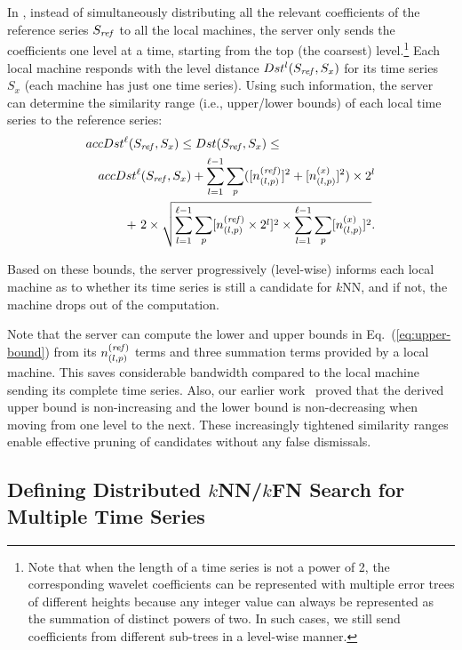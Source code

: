 In \LeeWave{}, instead of simultaneously distributing all the relevant
coefficients of the reference series $\Sref$ to all the local machines,
the server only sends the coefficients one level at a time, starting
from the top (the coarsest) level.\footnote{\label{fnt:T}Note
that when the length of a time series is not a power of 2, the
corresponding wavelet coefficients can be represented with multiple
error trees of different heights because any integer value can always
be represented as the summation of distinct powers of two. In such
cases, we still send coefficients from different
sub-trees in a level-wise manner.} Each local machine responds with the
level distance $Dst^{l}(\Sref,S_x)$ for its time series $S_x$ (each machine has
just one time series). Using
such information, the server can determine the similarity range (i.e.,
upper/lower bounds) of each local time series to the reference series:
{\small
\begin{eqnarray}\label{eq:upper-bound}
\lefteqn{accDst^{\ell }(\Sref,S_{x}) \leq Dst(\Sref,S_{x}) \leq} \notag\\
&& accDst^{\ell }(\Sref,S_{x})+\sum_{l=1}^{\ell-1}
  \sum_{p}([n_{(l,p)}^{(\supref)}]^{2}+[n_{(l,p)}^{(x)}]^{2}) \times 2^{l} \notag \\
&& +\ 2 \times \sqrt{\sum_{l=1}^{\ell-1}\sum_{p}[n_{(l,p)}^{(\supref)}\times
  2^{l}]^{2}\times \sum_{l=1}^{\ell-1}\sum_{p}[n_{(l,p)}^{(x)}]^{2}}. 
\end{eqnarray}}

\noindent
Based on these bounds, the server progressively (level-wise) informs
each local machine as to whether its time series is still a candidate for
$k$NN, and if not, the machine drops out of the computation.

Note that the server can compute the lower and upper bounds in
Eq.~(\ref{eq:upper-bound}) from its $n_{(l,p)}^{(\supref)}$ terms and three
summation terms provided by a local machine.  This saves considerable
bandwidth compared to the local machine sending its complete time series.
Also, our earlier work~\cite{Yeh:2008:LLD} proved that the derived upper
bound is non-increasing and the lower bound is non-decreasing when
moving from one level to the next. These increasingly tightened
similarity ranges enable effective pruning of candidates without any
false dismissals.

\vspace{-0.1in}
\subsection{Defining Distributed $k$NN/$k$FN Search for Multiple Time Series}

